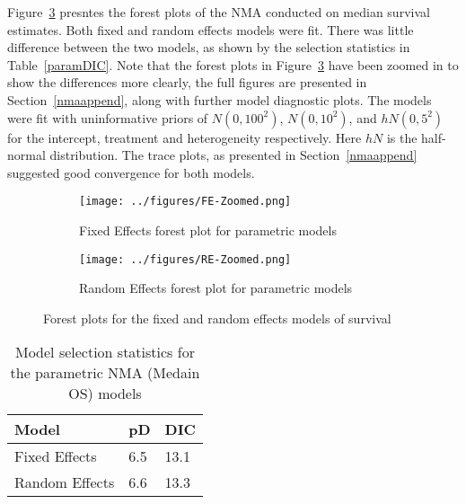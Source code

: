 Figure~\ref{fig:forests_param} presntes the forest plots of the NMA conducted on median survival estimates. Both fixed and random effects models were fit. There was little difference between the two models, as shown by the selection statistics in Table~\ref{paramDIC}. Note that the forest plots in Figure~\ref{fig:forests_param} have been zoomed in to show the differences more clearly, the full figures are presented in Section~\ref{nmaappend}, along with further model diagnostic plots. The models were fit with uninformative priors of $N(0, 100^2)$, $N(0, 10^2)$, and $hN(0, 5^2)$ for the intercept, treatment and heterogeneity respectively. Here $hN$ is the half-normal distribution. The trace plots, as presented in Section~\ref{nmaappend} suggested good convergence for both models. 

\begin{figure}[h]
    \centering
    \begin{subfigure}[b]{0.45\textwidth}
        \centering
        \texttt{[image: ../figures/FE-Zoomed.png]}
        \caption{Fixed Effects forest plot for parametric models}
        \label{fig:FEForestParam}
    \end{subfigure}
    \hfill
    \begin{subfigure}[b]{0.45\textwidth}
        \centering
        \texttt{[image: ../figures/RE-Zoomed.png]}
        \caption{Random Effects forest plot for parametric models}
        \label{fig:REForestParam}
    \end{subfigure}
    \caption{Forest plots for the fixed and random effects models of survival}
    \label{fig:forests_param}
\end{figure}

\begin{table}[h]
    \center
    \begin{tabular}{lll}
    \hline
    Model          & pD  & DIC  \\ \hline
    Fixed Effects  & 6.5 & 13.1   \\
    Random Effects & 6.6 & 13.3 \\ \hline
    \end{tabular}
    \caption{Model selection statistics for the parametric NMA (Medain OS) models}
    \label{paramMedianDIC}
\end{table}